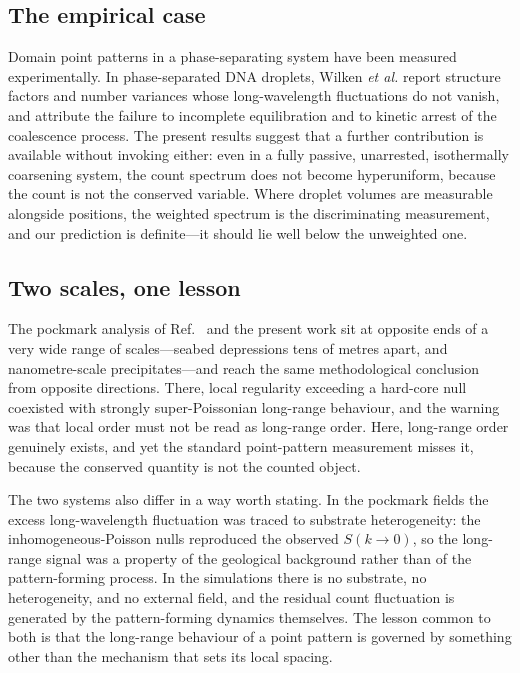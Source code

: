 \documentclass[aps,pre,twocolumn,superscriptaddress,floatfix,longbibliography]{revtex4-2}
\begin{document}
\subsection{The empirical case}

Domain point patterns in a phase-separating system have been measured
experimentally. In phase-separated DNA droplets, Wilken \emph{et al.}
\cite{Wilken2023} report structure factors and number variances whose
long-wavelength fluctuations do not vanish, and attribute the failure to
incomplete equilibration and to kinetic arrest of the coalescence process.
The present results suggest that a further contribution is available without
invoking either: even in a fully passive, unarrested, isothermally coarsening
system, the count spectrum does not become hyperuniform, because the count is
not the conserved variable. Where droplet volumes are measurable alongside
positions, the weighted spectrum is the discriminating measurement, and our
prediction is definite---it should lie well below the unweighted one.

\subsection{Two scales, one lesson}

The pockmark analysis of Ref.~\cite{Chen2026} and the present work sit at
opposite ends of a very wide range of scales---seabed depressions tens of
metres apart, and nanometre-scale precipitates---and reach the same
methodological conclusion from opposite directions. There, local regularity
exceeding a hard-core null coexisted with strongly super-Poissonian long-range
behaviour, and the warning was that local order must not be read as long-range
order. Here, long-range order genuinely exists, and yet the standard
point-pattern measurement misses it, because the conserved quantity is not the
counted object.

The two systems also differ in a way worth stating. In the pockmark fields the
excess long-wavelength fluctuation was traced to substrate heterogeneity: the
inhomogeneous-Poisson nulls reproduced the observed $S(k \to 0)$, so the
long-range signal was a property of the geological background rather than of
the pattern-forming process. In the simulations there is no substrate, no
heterogeneity, and no external field, and the residual count fluctuation is
generated by the pattern-forming dynamics themselves. The lesson common to
both is that the long-range behaviour of a point pattern is governed by
something other than the mechanism that sets its local spacing.
\end{document}
